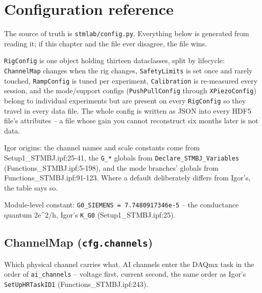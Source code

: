 \setcounter{chapter}{1}
\chapter{Configuration reference}

The source of truth is \texttt{stmlab/\discretionary{}{}{}config.\discretionary{}{}{}py}. Everything below is generated from reading it; if this chapter and the file ever disagree, the file wins.

\texttt{Rig\discretionary{}{}{}Config} is one object holding thirteen dataclasses, split by lifecycle: \texttt{Channel\discretionary{}{}{}Map} changes when the rig changes, \texttt{Safety\discretionary{}{}{}Limits} is set once and rarely touched, \texttt{Ramp\discretionary{}{}{}Config} is tuned per experiment, \texttt{Calibration} is re-measured every session, and the mode/support configs (\texttt{Push\discretionary{}{}{}Pull\discretionary{}{}{}Config} through \texttt{XPiezo\discretionary{}{}{}Config}) belong to individual experiments but are present on every \texttt{Rig\discretionary{}{}{}Config} so they travel in every data file. The whole config is written as JSON into every HDF5 file's attributes -- a file whose gain you cannot reconstruct six months later is not data.

Igor origins: the channel names and scale constants come from Setup1\_STMBJ.ipf:25-41, the \texttt{G\_\discretionary{}{}{}*} globals from \texttt{Declare\_\discretionary{}{}{}STMBJ\_\discretionary{}{}{}Variables} (Functions\_STMBJ.ipf:5-198), and the mode branches' globals from Functions\_STMBJ.ipf:91-123. Where a default deliberately differs from Igor's, the table says so.

Module-level constant: \texttt{G0\_\discretionary{}{}{}SIEMENS = 7.\discretionary{}{}{}7480917346e-5} -- the conductance quantum 2e\textasciicircum{}2/h, Igor's \texttt{K\_\discretionary{}{}{}G0} (Setup1\_STMBJ.ipf:25).

\section{ChannelMap (\texttt{cfg.\discretionary{}{}{}channels})}

Which physical channel carries what. AI channels enter the DAQmx task in the order of \texttt{ai\_\discretionary{}{}{}channels} -- voltage first, current second, the same order as Igor's \texttt{Set\discretionary{}{}{}Up\discretionary{}{}{}HRTask\discretionary{}{}{}ID1} (Functions\_STMBJ.ipf:243).

